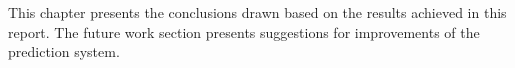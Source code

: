 This chapter presents the conclusions drawn based on the results achieved in this report. The future work section presents suggestions for improvements of the prediction system.